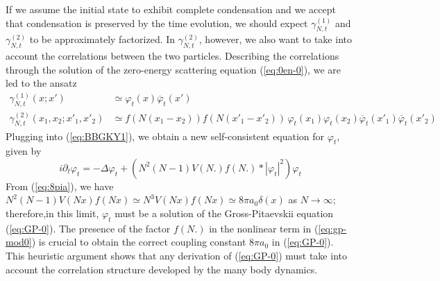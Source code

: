 \documentclass[11pt,a4paper]{article}
\begin{document}
If we assume the initial state to exhibit complete condensation and we accept that condensation is preserved by the time evolution, we should expect $\gamma^{(1)}_{N,t}$ and $\gamma^{(2)}_{N,t}$ to be approximately factorized. In $\gamma^{(2)}_{N,t}$, however, we also want to take into account the correlations between the two particles. Describing the correlations through the solution of the zero-energy scattering equation (\ref{eq:0en-0}), we are led to the ansatz
%
\begin{equation}\label{eq:ans-mod} \begin{split} 
\gamma^{(1)}_{N,t} (x;x') &\simeq \varphi_t (x) \overline{\varphi}_t (x') \\
\gamma^{(2)}_{N,t} (x_1, x_2; x'_1, x'_2) &\simeq  f (N (x_1 - x_2)) f (N (x'_1- x'_2)) \, \varphi_t (x_1)  \varphi_t (x_2) \overline{\varphi}_t (x'_1) \overline{\varphi}_t (x'_2)
\end{split} \end{equation}
Plugging into (\ref{eq:BBGKY1}), we obtain a new self-consistent equation for $\varphi_t$,  given by
\begin{equation}\label{eq:gp-mod0} i\partial_t \varphi_t = -\Delta \varphi_t + \left(N^2 (N-1) V(N.) f(N.) * |\varphi_t|^2 \right) \varphi_t
\end{equation}
{F}rom (\ref{eq:8pia}), we have $N^2 (N-1) V(Nx) f(Nx) \simeq N^3 V(Nx) f(Nx) \simeq 8\pi a_0 \delta (x)$ as $N \to \infty$; therefore,in this limit, $\varphi_t$ must be a solution of the Gross-Pitaevskii equation (\ref{eq:GP-0}). The presence of the factor $f(N.)$ in the nonlinear term in (\ref{eq:gp-mod0}) is crucial to obtain the correct coupling constant $8\pi a_0$ in (\ref{eq:GP-0}). This heuristic argument shows that any derivation of (\ref{eq:GP-0}) must take into account the correlation structure developed by the many body dynamics. 
 
\end{document}
